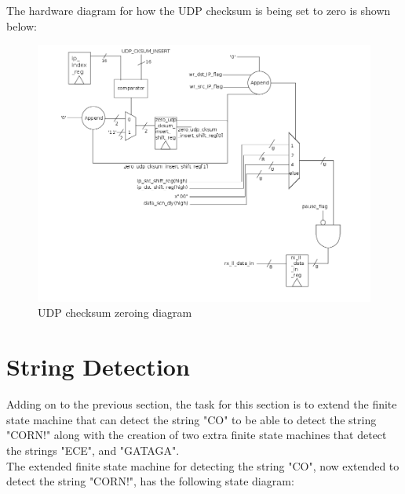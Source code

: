 \documentclass{article}
\begin{document}
The hardware diagram for how the UDP checksum is being set to zero is shown below:
	\begin{figure}[H]
		\begin{center}
			\includegraphics[scale=0.3]{../part2_files/udp_cksum.png}
			\caption{UDP checksum zeroing diagram}
		\end{center}
	\end{figure}


\section{String Detection}
Adding on to the previous section, the task for this section is to extend the finite state machine that can detect the string "CO" to be able to detect the string "CORN!" along with the creation of two extra finite state machines that detect the strings "ECE", and "GATAGA".\\

The extended finite state machine for detecting the string "CO", now extended to detect the string "CORN!", has the following state diagram:
\end{document}
